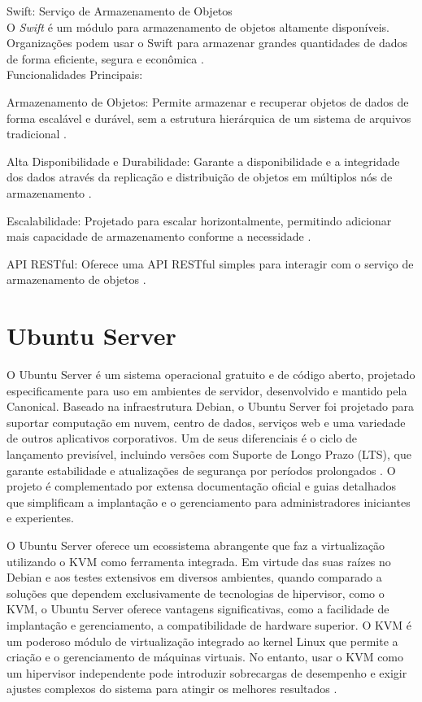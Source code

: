 \begin{description}
    \item Swift: Serviço de Armazenamento de Objetos\\
    O  \textit{Swift} é um módulo para armazenamento de objetos altamente disponíveis. Organizações podem usar o Swift para armazenar grandes quantidades de dados de forma eficiente, segura e econômica \cite{openstackswift}.\\
    Funcionalidades Principais:
    \begin{description}
        \item Armazenamento de Objetos: Permite armazenar e recuperar objetos de dados de forma escalável e durável, sem a estrutura hierárquica de um sistema de arquivos tradicional \cite{openstackswift}.
        \item Alta Disponibilidade e Durabilidade: Garante a disponibilidade e a integridade dos dados através da replicação e distribuição de objetos em múltiplos nós de armazenamento  \cite{openstackswift}.
        \item Escalabilidade: Projetado para escalar horizontalmente, permitindo adicionar mais capacidade de armazenamento conforme a necessidade  \cite{openstackswift}.
        \item API RESTful: Oferece uma API RESTful simples para interagir com o serviço de armazenamento de objetos  \cite{openstackswift}.
    \end{description}
\end{description}

\section{Ubuntu Server}
O Ubuntu Server é um sistema operacional gratuito e de código aberto, projetado especificamente para uso em ambientes de servidor, desenvolvido e mantido pela Canonical. Baseado na infraestrutura Debian, o Ubuntu Server foi projetado para suportar computação em nuvem, centro de dados, serviços web e uma variedade de outros aplicativos corporativos. Um de seus diferenciais é o ciclo de lançamento previsível, incluindo versões com Suporte de Longo Prazo (LTS), que garante estabilidade e atualizações de segurança por períodos prolongados \cite{ubuntu2025}. O projeto é complementado por extensa documentação oficial e guias detalhados que simplificam a implantação e o gerenciamento para administradores iniciantes e experientes.

O Ubuntu Server oferece um ecossistema abrangente que faz a virtualização utilizando o KVM como ferramenta integrada. Em virtude das suas raízes no Debian e aos testes extensivos em diversos ambientes, quando comparado a soluções que dependem exclusivamente de tecnologias de hipervisor, como o KVM, o Ubuntu Server oferece vantagens significativas, como a facilidade de implantação e gerenciamento, a compatibilidade de hardware superior. O KVM é um poderoso módulo de virtualização integrado ao kernel Linux que permite a criação e o gerenciamento de máquinas virtuais. No entanto, usar o KVM como um hipervisor independente pode introduzir sobrecargas de desempenho e exigir ajustes complexos do sistema para atingir os melhores resultados \cite{reddy2014}.


